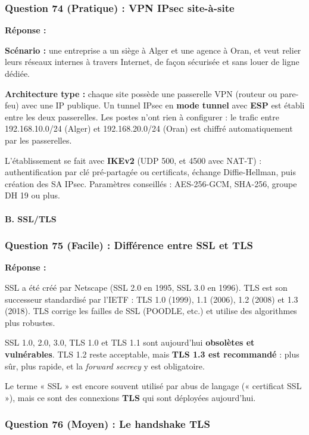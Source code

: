 \documentclass[12pt,a4paper]{article}
\newcommand{\reponse}{\textbf{Réponse :}\par}
\begin{document}
\subsubsection*{Question 74 (Pratique) : VPN IPsec site-à-site}

\reponse
\textbf{Scénario :} une entreprise a un siège à Alger et une agence à
Oran, et veut relier leurs réseaux internes à travers Internet, de
façon sécurisée et sans louer de ligne dédiée.

\textbf{Architecture type :} chaque site possède une passerelle VPN
(routeur ou pare-feu) avec une IP publique. Un tunnel IPsec en
\textbf{mode tunnel} avec \textbf{ESP} est établi entre les deux
passerelles. Les postes n'ont rien à configurer : le trafic entre
192.168.10.0/24 (Alger) et 192.168.20.0/24 (Oran) est chiffré
automatiquement par les passerelles.

L'établissement se fait avec \textbf{IKEv2} (UDP 500, et 4500 avec
NAT-T) : authentification par clé pré-partagée ou certificats, échange
Diffie-Hellman, puis création des SA IPsec. Paramètres conseillés :
AES-256-GCM, SHA-256, groupe DH 19 ou plus.

\paragraph{B. SSL/TLS}

\subsubsection*{Question 75 (Facile) : Différence entre SSL et TLS}

\reponse
SSL a été créé par Netscape (SSL 2.0 en 1995, SSL 3.0 en 1996). TLS est
son successeur standardisé par l'IETF : TLS 1.0 (1999), 1.1 (2006), 1.2
(2008) et 1.3 (2018). TLS corrige les failles de SSL (POODLE, etc.) et
utilise des algorithmes plus robustes.

SSL 1.0, 2.0, 3.0, TLS 1.0 et TLS 1.1 sont aujourd'hui \textbf{obsolètes
et vulnérables}. TLS 1.2 reste acceptable, mais \textbf{TLS 1.3 est
recommandé} : plus sûr, plus rapide, et la \textit{forward secrecy} y est
obligatoire.

Le terme « SSL » est encore souvent utilisé par abus de langage
(« certificat SSL »), mais ce sont des connexions \textbf{TLS} qui sont
déployées aujourd'hui.

\subsubsection*{Question 76 (Moyen) : Le handshake TLS}
\end{document}

